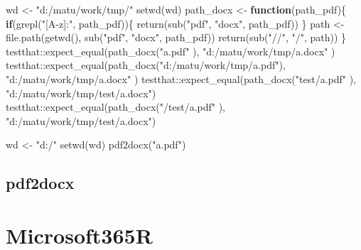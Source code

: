 \documentclass[
]{article}
\newenvironment{Shaded}{\begin{snugshade}}{\end{snugshade}}
\newcommand{\ControlFlowTok}[1]{\textcolor[rgb]{0.13,0.29,0.53}{\textbf{#1}}}
\newcommand{\FunctionTok}[1]{\textcolor[rgb]{0.00,0.00,0.00}{#1}}
\newcommand{\NormalTok}[1]{#1}
\newcommand{\OtherTok}[1]{\textcolor[rgb]{0.56,0.35,0.01}{#1}}
\newcommand{\SpecialCharTok}[1]{\textcolor[rgb]{0.00,0.00,0.00}{#1}}
\newcommand{\StringTok}[1]{\textcolor[rgb]{0.31,0.60,0.02}{#1}}
\begin{document}
\begin{Shaded}
\begin{Highlighting}[]
\NormalTok{wd }\OtherTok{\textless{}{-}} \StringTok{"d:/matu/work/tmp/"}
\FunctionTok{setwd}\NormalTok{(wd)}
\NormalTok{path\_docx }\OtherTok{\textless{}{-}} \ControlFlowTok{function}\NormalTok{(path\_pdf)\{}
  \ControlFlowTok{if}\NormalTok{(}\FunctionTok{grepl}\NormalTok{(}\StringTok{"[A{-}z]:"}\NormalTok{, path\_pdf))\{}
    \FunctionTok{return}\NormalTok{(}\FunctionTok{sub}\NormalTok{(}\StringTok{"pdf"}\NormalTok{, }\StringTok{"docx"}\NormalTok{, path\_pdf))}
\NormalTok{  \}}
\NormalTok{  path }\OtherTok{\textless{}{-}} \FunctionTok{file.path}\NormalTok{(}\FunctionTok{getwd}\NormalTok{(), }\FunctionTok{sub}\NormalTok{(}\StringTok{"pdf"}\NormalTok{, }\StringTok{"docx"}\NormalTok{, path\_pdf))}
  \FunctionTok{return}\NormalTok{(}\FunctionTok{sub}\NormalTok{(}\StringTok{"//"}\NormalTok{, }\StringTok{"/"}\NormalTok{, path))}
\NormalTok{\}}
\NormalTok{testthat}\SpecialCharTok{::}\FunctionTok{expect\_equal}\NormalTok{(}\FunctionTok{path\_docx}\NormalTok{(}\StringTok{"a.pdf"}\NormalTok{                 ), }\StringTok{"d:/matu/work/tmp/a.docx"}\NormalTok{     )}
\NormalTok{testthat}\SpecialCharTok{::}\FunctionTok{expect\_equal}\NormalTok{(}\FunctionTok{path\_docx}\NormalTok{(}\StringTok{"d:/matu/work/tmp/a.pdf"}\NormalTok{), }\StringTok{"d:/matu/work/tmp/a.docx"}\NormalTok{     )}
\NormalTok{testthat}\SpecialCharTok{::}\FunctionTok{expect\_equal}\NormalTok{(}\FunctionTok{path\_docx}\NormalTok{(}\StringTok{"test/a.pdf"}\NormalTok{            ), }\StringTok{"d:/matu/work/tmp/test/a.docx"}\NormalTok{)}
\NormalTok{testthat}\SpecialCharTok{::}\FunctionTok{expect\_equal}\NormalTok{(}\FunctionTok{path\_docx}\NormalTok{(}\StringTok{"/test/a.pdf"}\NormalTok{           ), }\StringTok{"d:/matu/work/tmp/test/a.docx"}\NormalTok{)}


\NormalTok{wd }\OtherTok{\textless{}{-}} \StringTok{"d:/"}
\FunctionTok{setwd}\NormalTok{(wd)}
\FunctionTok{pdf2docx}\NormalTok{(}\StringTok{"a.pdf"}\NormalTok{)}
\end{Highlighting}
\end{Shaded}

\hypertarget{pdf2docx-1}{%
\subsection{pdf2docx}\label{pdf2docx-1}}

\hypertarget{microsoft365r}{%
\section{Microsoft365R}\label{microsoft365r}}
\end{document}
